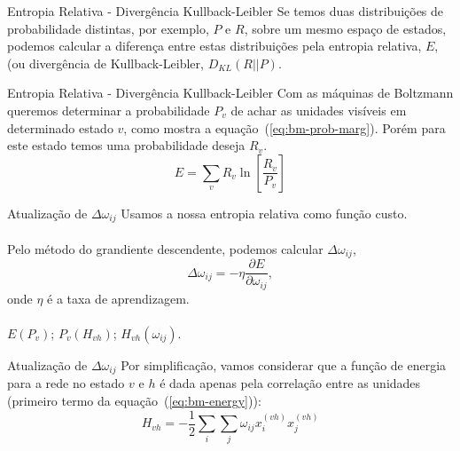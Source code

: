 \begin{frame}{Entropia Relativa - Divergência Kullback-Leibler}%
  \justifying%
  Se temos duas distribuições de probabilidade distintas, por exemplo, $P$ e $R$, sobre um mesmo espaço de estados, podemos calcular a diferença entre estas distribuições pela entropia relativa, $E$, (ou divergência de Kullback-Leibler, $D_{KL}(R||P)$.
\end{frame}
  
\begin{frame}{Entropia Relativa - Divergência Kullback-Leibler}%
  \justifying%
  Com as máquinas de Boltzmann queremos determinar a probabilidade $P_{v}$ de achar as unidades visíveis em determinado estado $v$, como mostra a equação~(\ref{eq:bm-prob-marg}). Porém para este estado temos uma probabilidade deseja $R_{v}$.
  \begin{equation}%
    \label{eq:bm-entropy}
    E = \sum_{v} R_{v} \ln \left[\frac{R_{v}}{P_{v}} \right]
  \end{equation}
\end{frame}

\begin{frame}{Atualização de $\Delta \omega_{ij}$}%
  \justifying%
  Usamos a nossa entropia relativa como função custo.
  \\~\\
  Pelo método do grandiente descendente, podemos calcular $\Delta \omega_{ij}$,
  \begin{equation}%
    \label{eq:omega-delta}
    \Delta \omega_{ij} = -\eta \frac{\partial E}{\partial \omega_{ij}},
  \end{equation}
  onde $\eta$ é a taxa de aprendizagem.
  \\~\\
  $E(P_{v})$; $P_{v}(H_{vh})$; $H_{vh}(\omega_{ij})$.
\end{frame} 

\begin{frame}{Atualização de $\Delta \omega_{ij}$}%
  \justifying%
  Por simplificação, vamos considerar que a função de energia para a rede no estado $v$ e $h$ é dada apenas pela correlação entre as unidades (primeiro termo da equação~(\ref{eq:bm-energy})):
  \begin{equation}%
    \label{eq:bm-energy-simple}
    H_{vh} = -\frac{1}{2} \sum_{i} \sum_{j} \omega_{ij} x^{(vh)}_{i} x^{(vh)}_{j}  
  \end{equation}
\end{frame}

